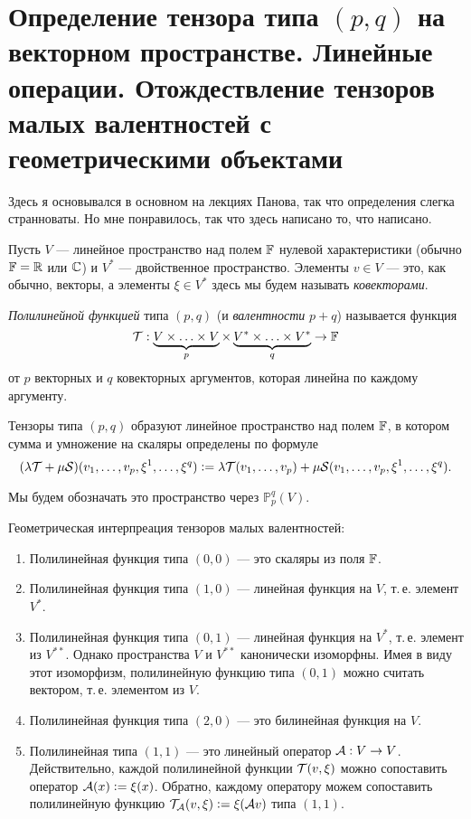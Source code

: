 \section{Определение тензора типа $(p, q)$ на векторном пространстве. Линейные операции. Отождествление тензоров малых валентностей с геометрическими объектами}

Здесь я основывался в основном на лекциях Панова, так что определения слегка странноваты. Но мне понравилось, так что здесь написано то, что написано.

Пусть $V$ --- линейное пространство над полем $\mathbb{F}$ нулевой характеристики (обычно $\mathbb{F} = \mathbb{R}$ или $\mathbb{C}$) и $V^\ast$ --- двойственное пространство. Элементы $v \in V$ --- это, как обычно, векторы, а элементы $\xi \in V^\ast$ здесь мы будем называть \textit{ковекторами}.

\begin{definition}
    \textit{Полилинейной функцией} типа $(p, q)$ (и \textit{валентности} $p + q$) называется функция
    \[
        \mathcal{T}: \underbrace{V \times \ldots \times V}_p \times \underbrace{V^\ast \times \ldots \times V^\ast}_q \to \mathbb{F}
    \]
    от $p$ векторных и $q$ ковекторных аргументов, которая линейна по каждому аргументу.
\end{definition}

Тензоры типа $(p, q)$ образуют линейное пространство над полем $\mathbb{F}$, в котором сумма и умножение на скаляры определены по формуле
\[
    (\lambda\mathcal{T} + \mu\mathcal{S})(v_1, \ldots, v_p, \xi^1, \ldots, \xi^q) \vcentcolon = \lambda\mathcal{T}(v_1, \ldots, v_p) + \mu\mathcal{S}(v_1, \ldots, v_p, \xi^1, \ldots, \xi^q).
\]

Мы будем обозначать это пространство через $\mathbb{P}_p^q(V)$.

\begin{example}
    Геометрическая интерпреация тензоров малых валентностей:
    \begin{enumerate}
        \item Полилинейная функция типа $(0, 0)$ --- это скаляры из поля $\mathbb{F}$.
        \item Полилинейная функция типа $(1, 0)$ --- линейная функция на $V$, т.\,е. элемент $V^\ast$.
        \item Полилинейная функция типа $(0, 1)$ --- линейная функция на $V^\ast$, т.\,е. элемент из $V^{\ast\ast}$. Однако пространства $V$ и $V^{\ast\ast}$ канонически изоморфны. Имея в виду этот изоморфизм, полилинейную функцию типа $(0, 1)$ можно считать вектором, т.\,е. элементом из $V$.
        \item Полилинейная функция типа $(2, 0)$ --- это билинейная функция на $V$.
        \item Полилинейная типа $(1, 1)$ --- это линейный оператор $\mathcal{A}: V \to V$. Действительно, каждой полилинейной функции $\mathcal{T}(v, \xi)$ можно сопоставить оператор $\mathcal{A}(x) \vcentcolon = \xi(x)$. Обратно, каждому оператору можем сопоставить полилинейную функцию $\mathcal{T}_{\mathcal{A}}(v, \xi) \vcentcolon = \xi(\mathcal{A} v)$ типа $(1, 1)$.
    \end{enumerate}
\end{example}

